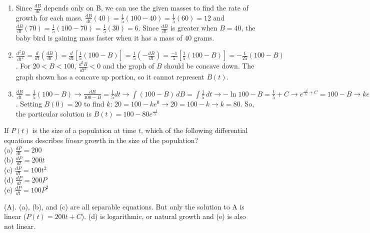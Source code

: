 \begin{Answer}[ref = diffeq2]
\begin{enumerate}
\item Since $\frac{dB}{dt}$ depends only on B, we can use the given masses to 
find the rate of growth for each mass. $\frac{dB}{dt}(40) = \frac{1}{5} \left( 
100 - 40 \right) = \frac{1}{5} \left(60 \right) = 12$ and $\frac{dB}{dt}(70) = 
\frac{1}{5} \left( 100 - 70 \right) = \frac{1}{5} \left( 30 \right) = 6$. 
Since $\frac{dB}{dt}$ is greater when $B = 40$, the baby bird is gaining mass 
faster when it has a mass of $40$ grams. 
\item $\frac{d^2 B}{dt^2} = \frac{d}{dt} \left( \frac{dB}{dt} \right) = 
\frac{d}{dt} \left[ \frac{1}{5} \left(100 - B \right) \right] = \frac{1}{5} 
\left( -\frac{dB}{dt} \right) = \frac{-1}{5} \left[\frac{1}{5} \left( 100 - B 
\right) \right] = -\frac{1}{25} \left(100 - B \right)$. For $20 < B < 100$, 
$\frac{d^2 B}{dt^2} < 0$ and the graph of $B$ should be concave down. The 
graph shown has a concave up portion, so it cannot represent $B(t)$. 
\item $\frac{dB}{dt} = \frac{1}{5} \left( 100 - B \right) \rightarrow 
\frac{dB}{100 - B} = \frac{1}{5} dt \rightarrow \int \left(100 - B \right)\,dB 
= \int \frac{1}{5}\,dt \rightarrow -\ln{100 - B} = \frac{t}{5} + C \rightarrow 
e^{\frac{-t}{5} + C} = 100 - B \rightarrow ke^{\frac{-t}{5}} = 100 - B 
\rightarrow B(t) = 100 - ke^{\frac{-t}{5}}$. Setting $B(0) = 20$ to find $k$: 
$20 = 100 - ke^{0} \rightarrow 20 = 100 - k \rightarrow k = 80$. So, the 
particular solution is $B(t) = 100 - 80e^{\frac{-t}{5}}$
\end{enumerate}
\end{Answer}

\begin{Exercise} If $P(t)$ is the size of a 
population at time $t$, which of the following differential equations 
describes \textit{linear} growth in the size of the population?\\
(a) $\frac{dP}{dt} = 200$\\
(b) $\frac{dP}{dt} = 200t$\\
(c) $\frac{dP}{dt} = 100t^2$\\
(d) $\frac{dP}{dt} = 200P$\\
(e) $\frac{dP}{dt} = 100P^2$
\end{Exercise}

\begin{Answer}[ref = popgrowth]
(A). (a), (b), and (c) are all separable equations. But only the solution to A 
is linear ($P(t) = 200t + C$). (d) is logarithmic, or natural growth and (e) 
is also not linear.
\end{Answer}


